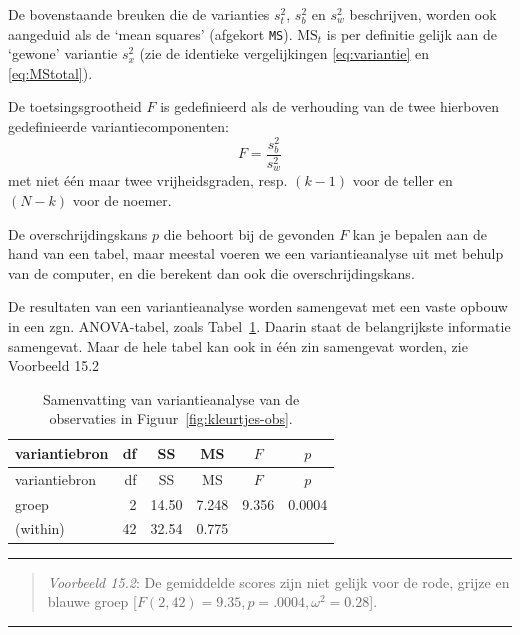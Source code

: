 \documentclass[
]{book}
\begin{document}
De bovenstaande breuken die de varianties \(s^2_t\), \(s^2_b\) en \(s^2_w\)
beschrijven, worden ook aangeduid als de `mean squares' (afgekort \texttt{MS}).
\(\textrm{MS}_{t}\) is per definitie gelijk aan de `gewone' variantie
\(s^2_x\) (zie de identieke vergelijkingen
\eqref{eq:variantie} en
\eqref{eq:MStotal}).

De toetsingsgrootheid \(F\) is gedefinieerd als de verhouding van de twee
hierboven gedefinieerde variantiecomponenten:
\begin{equation}
  \label{eq:Fratio}
    F = \frac{ s^2_b } { s^2_w }
\end{equation}
met niet één maar twee
vrijheidsgraden, resp. \((k-1)\) voor de teller en \((N-k)\) voor de noemer.

De overschrijdingskans \(p\) die behoort bij de gevonden \(F\) kan je
bepalen aan de hand van een tabel, maar meestal voeren we een
variantieanalyse uit met behulp van de computer, en die berekent dan ook
die overschrijdingskans.

De resultaten van een variantieanalyse worden samengevat met een vaste
opbouw in een zgn. ANOVA-tabel, zoals
Tabel~\ref{tab:kleurtjes-anova}. Daarin staat de belangrijkste
informatie samengevat. Maar de hele tabel kan ook in één zin samengevat
worden, zie Voorbeeld 15.2

\begin{longtable}[]{@{}lrcccc@{}}
\caption{\label{tab:kleurtjes-anova} Samenvatting van variantieanalyse van de observaties in Figuur~\ref{fig:kleurtjes-obs}.}\tabularnewline
\toprule
variantiebron & df & SS & MS & \(F\) & \(p\)\tabularnewline
\midrule
\endfirsthead
\toprule
variantiebron & df & SS & MS & \(F\) & \(p\)\tabularnewline
\midrule
\endhead
groep & 2 & 14.50 & 7.248 & 9.356 & 0.0004\tabularnewline
(within) & 42 & 32.54 & 0.775 & &\tabularnewline
\bottomrule
\end{longtable}

\begin{center}\rule{0.5\linewidth}{0.5pt}\end{center}

\begin{quote}
\emph{Voorbeeld 15.2}:
De gemiddelde scores zijn niet gelijk voor de rode, grijze en blauwe groep
{[}\(F(2,42) = 9.35, p = .0004, \omega^2 = 0.28\){]}.
\end{quote}

\begin{center}\rule{0.5\linewidth}{0.5pt}\end{center}
\end{document}
